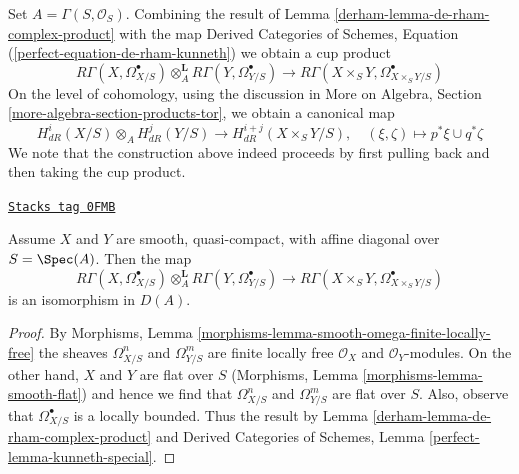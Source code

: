 Set $A = \Gamma(S, \mathcal{O}_S)$. Combining the result of
Lemma \ref{derham-lemma-de-rham-complex-product} with the map
Derived Categories of Schemes, Equation
(\ref{perfect-equation-de-rham-kunneth})
we obtain a cup product
$$
R\Gamma(X, \Omega^\bullet_{X/S})
\otimes_A^\mathbf{L}
R\Gamma(Y, \Omega^\bullet_{Y/S})
\longrightarrow
R\Gamma(X \times_S Y, \Omega^\bullet_{X \times_S Y/S})
$$
On the level of cohomology, using the discussion in
More on Algebra, Section \ref{more-algebra-section-products-tor},
we obtain a canonical map
$$
H^i_{dR}(X/S) \otimes_A H^j_{dR}(Y/S)
\longrightarrow
H^{i + j}_{dR}(X \times_S Y/S),\quad
(\xi, \zeta) \longmapsto p^*\xi \cup q^*\zeta
$$
We note that the construction above indeed proceeds by
first pulling back and then taking the cup product.

\begin{lemma}
\label{derham-lemma-kunneth-de-rham}
\href{https://stacks.math.columbia.edu/tag/0FMB}{\texttt{Stacks tag 0FMB}}

Assume $X$ and $Y$ are smooth, quasi-compact, with affine diagonal over
$S = \Spec(A)$. Then the map
$$
R\Gamma(X, \Omega^\bullet_{X/S})
\otimes_A^\mathbf{L}
R\Gamma(Y, \Omega^\bullet_{Y/S})
\longrightarrow
R\Gamma(X \times_S Y, \Omega^\bullet_{X \times_S Y/S})
$$
is an isomorphism in $D(A)$.
\end{lemma}

\begin{proof}

By Morphisms, Lemma \ref{morphisms-lemma-smooth-omega-finite-locally-free}
the sheaves $\Omega^n_{X/S}$ and $\Omega^m_{Y/S}$ are finite locally free
$\mathcal{O}_X$ and $\mathcal{O}_Y$-modules. On the other hand, $X$ and $Y$
are flat over $S$ (Morphisms, Lemma \ref{morphisms-lemma-smooth-flat})
and hence we find that $\Omega^n_{X/S}$ and $\Omega^m_{Y/S}$ are flat over $S$.
Also, observe that $\Omega^\bullet_{X/S}$ is a locally bounded. Thus
the result by Lemma \ref{derham-lemma-de-rham-complex-product} and
Derived Categories of Schemes, Lemma \ref{perfect-lemma-kunneth-special}.
\end{proof}

